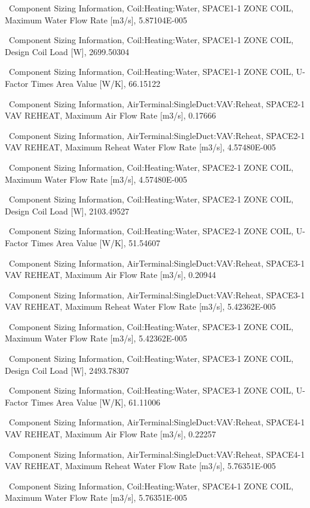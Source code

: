 ~Component Sizing Information, Coil:Heating:Water, SPACE1-1 ZONE COIL, Maximum Water Flow Rate {[}m3/s{]}, 5.87104E-005

~Component Sizing Information, Coil:Heating:Water, SPACE1-1 ZONE COIL, Design Coil Load {[}W{]}, 2699.50304

~Component Sizing Information, Coil:Heating:Water, SPACE1-1 ZONE COIL, U-Factor Times Area Value {[}W/K{]}, 66.15122

~Component Sizing Information, AirTerminal:SingleDuct:VAV:Reheat, SPACE2-1 VAV REHEAT, Maximum Air Flow Rate {[}m3/s{]}, 0.17666

~Component Sizing Information, AirTerminal:SingleDuct:VAV:Reheat, SPACE2-1 VAV REHEAT, Maximum Reheat Water Flow Rate {[}m3/s{]}, 4.57480E-005

~Component Sizing Information, Coil:Heating:Water, SPACE2-1 ZONE COIL, Maximum Water Flow Rate {[}m3/s{]}, 4.57480E-005

~Component Sizing Information, Coil:Heating:Water, SPACE2-1 ZONE COIL, Design Coil Load {[}W{]}, 2103.49527

~Component Sizing Information, Coil:Heating:Water, SPACE2-1 ZONE COIL, U-Factor Times Area Value {[}W/K{]}, 51.54607

~Component Sizing Information, AirTerminal:SingleDuct:VAV:Reheat, SPACE3-1 VAV REHEAT, Maximum Air Flow Rate {[}m3/s{]}, 0.20944

~Component Sizing Information, AirTerminal:SingleDuct:VAV:Reheat, SPACE3-1 VAV REHEAT, Maximum Reheat Water Flow Rate {[}m3/s{]}, 5.42362E-005

~Component Sizing Information, Coil:Heating:Water, SPACE3-1 ZONE COIL, Maximum Water Flow Rate {[}m3/s{]}, 5.42362E-005

~Component Sizing Information, Coil:Heating:Water, SPACE3-1 ZONE COIL, Design Coil Load {[}W{]}, 2493.78307

~Component Sizing Information, Coil:Heating:Water, SPACE3-1 ZONE COIL, U-Factor Times Area Value {[}W/K{]}, 61.11006

~Component Sizing Information, AirTerminal:SingleDuct:VAV:Reheat, SPACE4-1 VAV REHEAT, Maximum Air Flow Rate {[}m3/s{]}, 0.22257

~Component Sizing Information, AirTerminal:SingleDuct:VAV:Reheat, SPACE4-1 VAV REHEAT, Maximum Reheat Water Flow Rate {[}m3/s{]}, 5.76351E-005

~Component Sizing Information, Coil:Heating:Water, SPACE4-1 ZONE COIL, Maximum Water Flow Rate {[}m3/s{]}, 5.76351E-005

